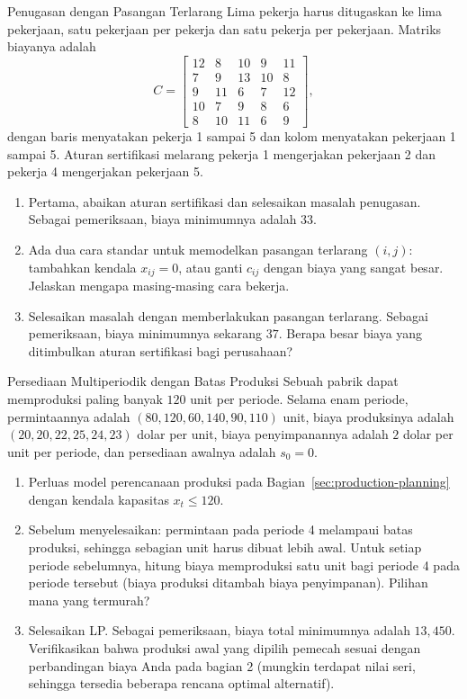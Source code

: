 \begin{ex}{Penugasan dengan Pasangan Terlarang}{}
\label{ex:assignment-forbidden}
 Lima pekerja harus ditugaskan ke lima pekerjaan, satu pekerjaan per pekerja dan satu pekerja per pekerjaan. Matriks biayanya adalah
\[
C = \begin{bmatrix}
12 & 8 & 10 & 9 & 11 \\
7 & 9 & 13 & 10 & 8 \\
9 & 11 & 6 & 7 & 12 \\
10 & 7 & 9 & 8 & 6 \\
8 & 10 & 11 & 6 & 9
\end{bmatrix},
\]
dengan baris menyatakan pekerja 1 sampai 5 dan kolom menyatakan pekerjaan 1 sampai 5. Aturan sertifikasi melarang pekerja 1 mengerjakan pekerjaan 2 dan pekerja 4 mengerjakan pekerjaan 5.
\begin{enumerate}
\item Pertama, abaikan aturan sertifikasi dan selesaikan masalah penugasan. Sebagai pemeriksaan, biaya minimumnya adalah $33$.
\item Ada dua cara standar untuk memodelkan pasangan terlarang $(i,j)$: tambahkan kendala $x_{ij} = 0$, atau ganti $c_{ij}$ dengan biaya yang sangat besar. Jelaskan mengapa masing-masing cara bekerja.
\item Selesaikan masalah dengan memberlakukan pasangan terlarang. Sebagai pemeriksaan, biaya minimumnya sekarang $37$. Berapa besar biaya yang ditimbulkan aturan sertifikasi bagi perusahaan?
\end{enumerate}
\end{ex}

\begin{ex}{Persediaan Multiperiodik dengan Batas Produksi}{}
\label{ex:capacitated-production}
 Sebuah pabrik dapat memproduksi paling banyak $120$ unit per periode. Selama enam periode, permintaannya adalah $(80, 120, 60, 140, 90, 110)$ unit, biaya produksinya adalah $(20, 20, 22, 25, 24, 23)$ dolar per unit, biaya penyimpanannya adalah $2$ dolar per unit per periode, dan persediaan awalnya adalah $s_0 = 0$.
\begin{enumerate}
\item Perluas model perencanaan produksi pada Bagian~\ref{sec:production-planning} dengan kendala kapasitas $x_t \leq 120$.
\item Sebelum menyelesaikan: permintaan pada periode 4 melampaui batas produksi, sehingga sebagian unit harus dibuat lebih awal. Untuk setiap periode sebelumnya, hitung biaya memproduksi satu unit bagi periode 4 pada periode tersebut (biaya produksi ditambah biaya penyimpanan). Pilihan mana yang termurah?
\item Selesaikan LP. Sebagai pemeriksaan, biaya total minimumnya adalah $13{,}450$. Verifikasikan bahwa produksi awal yang dipilih pemecah sesuai dengan perbandingan biaya Anda pada bagian 2 (mungkin terdapat nilai seri, sehingga tersedia beberapa rencana optimal alternatif).
\end{enumerate}
\exrefs{\S\ref{sec:production-planning}}
\end{ex}

